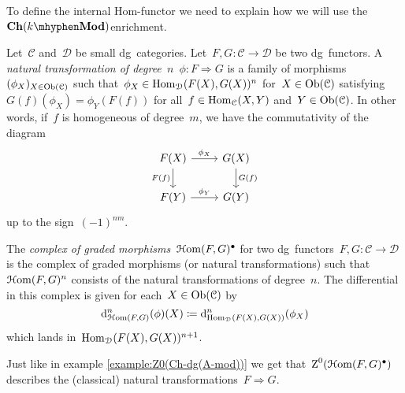 To define the internal Hom-functor we need to explain how we will use the~$\Ch(k\mhyphen\Mod)$\dash enrichment.
\begin{definition}
  \label{definition:complex-of-graded-morphisms}
  Let~$\mathcal{C}$ and~$\mathcal{D}$ be small dg~categories. Let~$F,G\colon\mathcal{C}\to\mathcal{D}$ be two dg~functors. A \emph{natural transformation of degree~$n$}~$\phi\colon F\Rightarrow G$ is a family of morphisms~$(\phi_X)_{X\in\operatorname{Ob}(\mathcal{C})}$ such that~$\phi_X\in\mathrm{Hom}_{\mathcal{D}}(F(X),G(X))^n$ for~$X\in\operatorname{Ob}(\mathcal{C})$ satisfying~$G(f)(\phi_X)=\phi_Y(F(f))$ for all~$f\in\mathrm{Hom}_{\mathcal{C}}(X,Y)$ and~$Y\in\operatorname{Ob}(\mathcal{C})$. In other words, if~$f$ is homogeneous of degree~$m$, we have the commutativity of the diagram
  \begin{equation}
    \begin{tikzcd}
      F(X) \arrow{r}{\phi_X} \arrow[swap]{d}{F(f)} & G(X) \arrow{d}{G(f)} \\
      F(Y) \arrow{r}{\phi_Y} & G(Y)
    \end{tikzcd}
  \end{equation}
  up to the sign~$(-1)^{nm}$.

  The \emph{complex of graded morphisms}~$\operatorname{\mathcal{H}om}(F,G)^\bullet$ for two dg~functors~$F,G\colon\mathcal{C}\to\mathcal{D}$ is the complex of graded morphisms (or natural transformations) such that~$\operatorname{\mathcal{H}om}(F,G)^n$ consists of the natural transformations of degree~$n$. The differential in this complex is given for each~$X\in\operatorname{Ob}(\mathcal{C})$ by
  \begin{equation}
    \mathrm{d}_{\operatorname{\mathcal{H}om}(F,G)}^n(\phi)(X)\coloneqq\mathrm{d}_{\mathrm{Hom}_{\mathcal{D}}(F(X),G(X))}^n(\phi_X)
  \end{equation}
  which lands in~$\mathrm{Hom}_{\mathcal{D}}(F(X),G(X))^{n+1}$.
\end{definition}

\begin{example}
  Just like in example \ref{example:Z0(Ch-dg(A-mod))} we get that~$\operatorname{Z}^0(\operatorname{\mathcal{H}om}(F,G)^\bullet)$ describes the (classical) natural transformations~$F\Rightarrow G$.
\end{example}

